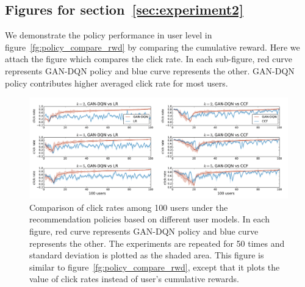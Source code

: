 \documentclass{article} %
\begin{document}
\subsection{Figures for section~\ref{sec:experiment2}}\label{app:exp_policy2}
 We demonstrate the policy performance in user level in figure~\ref{fg:policy_compare_rwd} by comparing the cumulative reward. Here we attach the figure which compares the click rate. In each sub-figure, red curve represents GAN-DQN policy and blue curve represents the other. GAN-DQN policy contributes higher averaged click rate for most users.
\begin{figure}[ht!]
\centering
\includegraphics[width=\textwidth]{policy_compare1_CTR.pdf}	
\caption{\small Comparison of click rates among 100 users under the recommendation policies based on different user models. In each figure, red curve represents GAN-DQN policy and blue curve represents the other. The experiments are repeated for 50 times and standard deviation is plotted as the shaded area. This figure is similar to figure~\ref{fg:policy_compare_rwd}, except that it plots the value of click rates instead of user's cumulative rewards.}
\end{figure}
\end{document}
